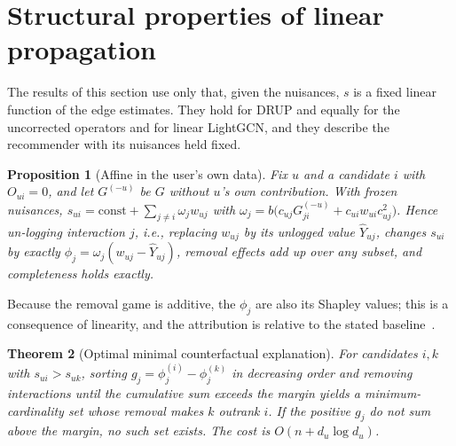 \documentclass[preprint,review,12pt,authoryear]{elsarticle}
\newtheorem{theorem}{Theorem}
\newtheorem{proposition}[theorem]{Proposition}
\theoremstyle{definition}
\begin{document}
\section{Structural properties of linear propagation}\label{sec:structth}

The results of this section use only that, given the nuisances, $s$ is a
fixed linear function of the edge estimates. They hold for DRUP and equally for
the uncorrected operators and for linear LightGCN, and they describe the
recommender with its nuisances held fixed.

\begin{proposition}[Affine in the user's own data]\label{prop:affine}
Fix $u$ and a candidate $i$ with $O_{ui}=0$, and let $G^{(-u)}$ be $G$ without
$u$'s own contribution. With frozen nuisances,
$s_{ui}=\mathrm{const}+\sum_{j\neq i}\omega_jw_{uj}$ with
$\omega_j=b\big(c_{uj}G^{(-u)}_{ji}+c_{ui}w_{ui}c_{uj}^2\big)$.
Hence un-logging interaction $j$, i.e., replacing $w_{uj}$ by its unlogged
value $\hat Y_{uj}$, changes $s_{ui}$ by exactly $\phi_j=\omega_j(w_{uj}-\hat Y_{uj})$,
removal effects add up over any subset, and completeness holds exactly.
\end{proposition}
Because the removal game is additive, the $\phi_j$ are also its Shapley values;
this is a consequence of linearity, and the attribution is relative to the
stated baseline~\citep{kumar2020shapley}.

\begin{theorem}[Optimal minimal counterfactual explanation]\label{thm:cf}
For candidates $i,k$ with $s_{ui}>s_{uk}$, sorting $g_j=\phi^{(i)}_j-\phi^{(k)}_j$ in
decreasing order and removing interactions until the cumulative sum exceeds the
margin yields a minimum-cardinality set whose removal makes $k$ outrank $i$.
If the positive $g_j$ do not sum above the margin, no such set exists. The
cost is $O(n+d_u\log d_u)$.
\end{theorem}
\end{document}

